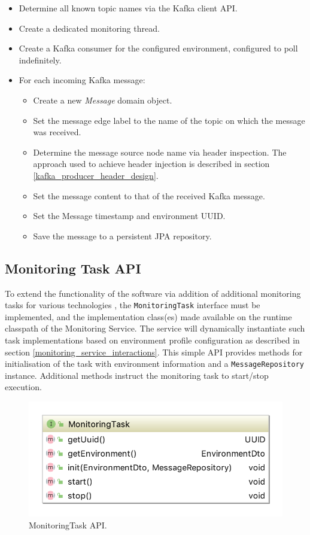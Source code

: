 \begin{itemize}
	\item Determine all known topic names via the Kafka client API.
	\item Create a dedicated monitoring thread.
	\item Create a Kafka consumer for the configured environment, configured to poll indefinitely.
	\item For each incoming Kafka message:
	\begin{itemize}
		\item Create a new \textit{Message} domain object.
		\item Set the message edge label to the name of the topic on which the message was received.
		\item Determine the message source node name via header inspection. The approach used to achieve header injection is described in section \ref{kafka_producer_header_design}.
		\item Set the message content to that of the received Kafka message.
		\item Set the Message timestamp and environment UUID.
		\item Save the message to a persistent JPA repository.
	\end{itemize}
\end{itemize}

\subsection{Monitoring Task API}
To extend the functionality of the software via addition of additional monitoring tasks for various technologies , the \texttt{MonitoringTask} interface must be implemented, and the implementation class(es) made available on the runtime classpath of the Monitoring Service. The service will dynamically instantiate such task implementations based on environment profile configuration as described in section \ref{monitoring_service_interactions}. This simple API provides methods for initialisation of the task with environment information and a \texttt{MessageRepository} instance. Additional methods instruct the monitoring task to start/stop execution.

\begin{figure}[H]
	\centering  
	\includegraphics[scale=2.0]{figures/impl/monitor/monitoring_task.png}
	\caption{MonitoringTask API.}
	\label{monitoring_task_api}
\end{figure}


